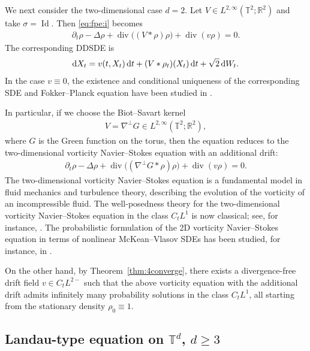 \documentclass[UTF-8,reqno]{amsart}
\numberwithin{equation}{section}
\theoremstyle{definition}
\def\dif{{\mathord{{\rm d}}}}
\def\geq{\geqslant}
\def\dif{{\mathord{{\rm d}}}}
\def\geq{\geqslant}
\begin{document}
We next consider the two-dimensional case $d=2$. Let
$V\in L^{2,\infty}(\mathbb{T}^2;\mathbb{R}^2)$ and take
$\sigma=\operatorname{Id}$. Then \eqref{eq:fpe:i} becomes
\begin{align*}
\partial_t\rho
-
\Delta\rho
+
\operatorname{div}\bigl((V*\rho)\rho\bigr)
+
\operatorname{div}(v\rho)
=
0 .
\end{align*}
The corresponding DDSDE is
\begin{align*}
\dif X_t
=
v(t,X_t)\,\dif t
+
(V*\rho_t)(X_t)\,\dif t
+
\sqrt{2}\,\dif W_t .
\end{align*}
In the case $v\equiv0$, the existence and conditional uniqueness of the
corresponding SDE and Fokker--Planck equation have been studied in
\cite{Kry20,Kry20b,RZZ25}.

In particular, if we choose the Biot--Savart kernel
\begin{align*}
V=\nabla^\perp G\in L^{2,\infty}(\mathbb{T}^2;\mathbb{R}^2),
\end{align*}
where  $G$ is the Green function on the torus, then the equation reduces to the
two-dimensional vorticity Navier--Stokes equation with an additional drift:
\begin{align*}
\partial_t\rho
-
\Delta\rho
+
\operatorname{div}\bigl((\nabla^\perp G*\rho)\rho\bigr)
+
\operatorname{div}(v\rho)
=
0 .
\end{align*} 
The two-dimensional vorticity Navier--Stokes equation is a fundamental model in
fluid mechanics and turbulence theory, describing the evolution of the
vorticity of an incompressible fluid. The well-posedness theory for the
two-dimensional vorticity Navier--Stokes equation in the class $C_tL^1$ is now
classical; see, for instance, \cite{MB03,BA94,GG05}.  The probabilistic formulation of the 2D vorticity
Navier--Stokes equation in terms of nonlinear McKean--Vlasov SDEs has been
studied, for instance, in \cite{BRZ25, RZZ25}.

On the other hand, by Theorem~\ref{thm:4converge}, there exists a
divergence-free drift field
$
v\in C_tL^{2-}
$
such that the above vorticity equation with the additional drift admits
infinitely many probability solutions in the class $C_tL^1$, all starting from
the stationary density $\rho_0\equiv1$.
 
 
  \subsection{Landau-type equation on $\mathbb{T}^d$, $d\geq 3$}
\label{sec:example:landau}
\end{document}
